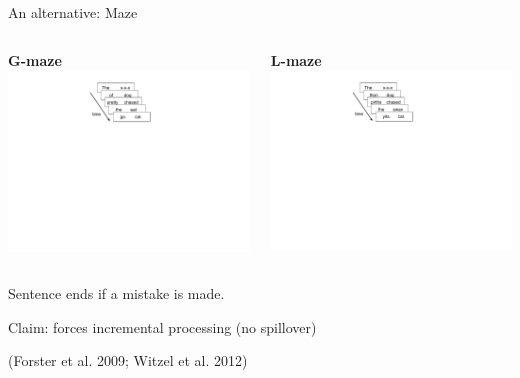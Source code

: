 \documentclass[12pt, xcolor=beamer,table,usenames,dvipsnames, ignorenonframetext, ngerman]{beamer}
\begin{document}
\begin{frame}{An alternative: Maze}
\begin{columns}
	\begin{column}{0.5\textwidth}
		\begin{center}
		\textbf{\large G-maze}
		\includegraphics[clip, trim=9cm 14cm 11cm 1cm,width=.9\textwidth]{../gmaze.pdf}
		\end{center}
	\pause
	\end{column}
	\begin{column}{0.5\textwidth} 
		\begin{center}
		\textbf{\large L-maze}
			\includegraphics[clip, trim=9cm 14cm 11cm 1cm,width=.9\textwidth]{../lmaze.pdf}
		\end{center}
	\end{column}
\end{columns}

\medskip
\pause
Sentence ends if a mistake is made.
\pause

Claim: forces incremental processing (no spillover)

\begin{flushright}
	{\small(Forster et al. 2009; Witzel et al. 2012)}
\end{flushright}
\end{frame}
\end{document}
